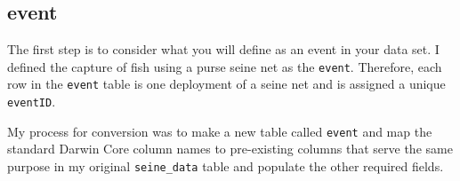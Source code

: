\documentclass[
]{book}
\begin{document}
\hypertarget{event}{%
\subsection{event}\label{event}}

The first step is to consider what you will define as an event in your data set. I defined the capture of fish using a purse seine net as the \texttt{event}. Therefore, each row in the \texttt{event} table is one deployment of a seine net and is assigned a unique \texttt{eventID}.

My process for conversion was to make a new table called \texttt{event} and map the standard Darwin Core column names to pre-existing columns that serve the same purpose in my original \texttt{seine\_data} table and populate the other required fields.
\end{document}

